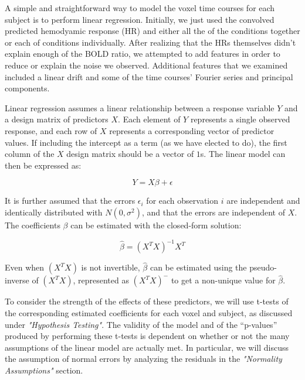 
\par \indent A simple and straightforward way to model the voxel time courses 
for each subject is to perform linear regression. Initially, we just used the 
convolved predicted hemodyamic response (HR) and either all the of the 
conditions together or each of conditions individually. After realizing that 
the HRs themselves didn't explain enough of the BOLD ratio, we attempted to 
add features in order to reduce or explain the noise we observed. Additional 
features that we examined included a linear drift and some of the time 
courses' Fourier series and principal components.

\par Linear regression assumes a linear relationship between a response 
variable $Y$ and a design matrix of predictors $X$. Each element of $Y$ 
represents a single observed response, and each row of $X$ represents a 
corresponding vector of predictor values. If including the intercept as a 
term (as we have elected to do), the first column of the $X$ design matrix 
should be a vector of $1$s. The linear model can then be expressed as: 

\begin{equation}
Y = X\beta + \epsilon
\end{equation}

\par It is further assumed that the errors $\epsilon_i$ for each observation 
$i$ are independent and identically distributed with $N(0, \sigma^2)$, and 
that the errors are independent of $X$. The coefficients $\beta$ can be 
estimated with the closed-form solution:

\begin{equation}
\hat{\beta} =(X^T X)^{-1} X^T 
\end{equation}

\par Even when $(X^T X)$ is not invertible, $\hat{\beta}$ can be estimated 
using the pseudo-inverse of $(X^T X)$, represented as $(X^T X)^{-}$ to get a 
non-unique value for $\hat{\beta}$.

\par To consider the strength of the effects of these predictors, we will use 
t-tests of the corresponding estimated coefficients for each voxel and 
subject, as discussed under \textit{"Hypothesis Testing"}. The validity of the 
model and of the ``p-values'' produced by performing these t-tests is 
dependent on whether or not the many assumptions of the linear model are 
actually met. In particular, we will discuss the assumption of normal errors 
by analyzing the residuals in the \textit{"Normality Assumptions"} section. 

